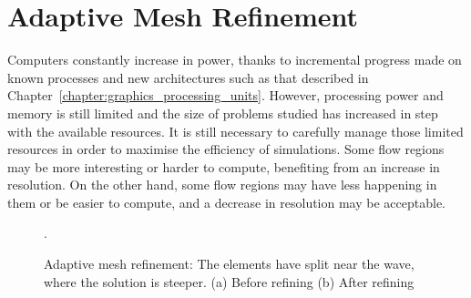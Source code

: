 \chapter{Adaptive Mesh Refinement} \label{chapter:adaptive_mesh_refinement} 

Computers constantly increase in power, thanks to incremental progress made on known processes and
new architectures such as that described in Chapter~\ref{chapter:graphics_processing_units}.
However, processing power and memory is still limited and the size of problems studied has
increased in step with the available resources. It is still necessary to carefully manage those
limited resources in order to maximise the efficiency of simulations. Some flow regions may be more
interesting or harder to compute, benefiting from an increase in resolution. On the other hand, some
flow regions may have less happening in them or be easier to compute, and a decrease in resolution
may be acceptable.

\begin{figure}[H]
	\centering
	\hfill
	\caption{Adaptive mesh refinement: The elements have split near the wave, where the solution is steeper. (a) Before refining (b) After refining}.
	\label{fig:mesh_refinement}
\end{figure}


